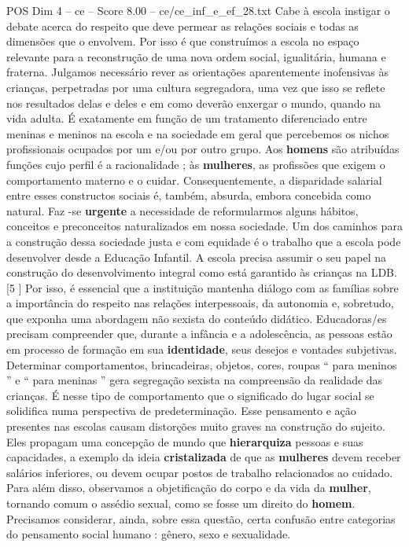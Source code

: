 \begin{textsample}{POS Dim 4 – ce – Score 8.00 – ce/ce\_inf\_e\_ef\_28.txt}
Cabe à escola instigar o debate acerca do respeito que deve permear as relações sociais e todas as dimensões que o envolvem.
Por isso é que construímos a escola no espaço relevante para a reconstrução de uma nova ordem social, igualitária, humana e fraterna.
Julgamos necessário rever as orientações aparentemente inofensivas às crianças, perpetradas por uma cultura segregadora, uma vez que isso se reflete nos resultados delas e deles e em como deverão enxergar o mundo, quando na vida adulta.
É exatamente em função de um tratamento diferenciado entre meninas e meninos na escola e na sociedade em geral que percebemos os nichos profissionais ocupados por um e/ou por outro grupo.
Aos \textbf{homens} são atribuídas funções cujo perfil é a racionalidade ; às \textbf{mulheres}, as profissões que exigem o comportamento materno e o cuidar.
Consequentemente, a disparidade salarial entre esses constructos sociais é, também, absurda, embora concebida como natural.
Faz -se \textbf{urgente} a necessidade de reformularmos alguns hábitos, conceitos e preconceitos naturalizados em nossa sociedade.
Um dos caminhos para a construção dessa sociedade justa e com equidade é o trabalho que a escola pode desenvolver desde a Educação Infantil.
A escola precisa assumir o seu papel na construção do desenvolvimento integral como está garantido às crianças na LDB.[5 ] Por isso, é essencial que a instituição mantenha diálogo com as famílias sobre a importância do respeito nas relações interpessoais, da autonomia e, sobretudo, que exponha uma abordagem não sexista do conteúdo didático.
Educadoras/es precisam compreender que, durante a infância e a adolescência, as pessoas estão em processo de formação em sua \textbf{identidade}, seus desejos e vontades subjetivas.
Determinar comportamentos, brincadeiras, objetos, cores, roupas “ para meninos ” e “ para meninas ” gera segregação sexista na compreensão da realidade das crianças.
É nesse tipo de comportamento que o significado do lugar social se solidifica numa perspectiva de predeterminação.
Esse pensamento e ação presentes nas escolas causam distorções muito graves na construção do sujeito.
Eles propagam uma concepção de mundo que \textbf{hierarquiza} pessoas e suas capacidades, a exemplo da ideia \textbf{cristalizada} de que as \textbf{mulheres} devem receber salários inferiores, ou devem ocupar postos de trabalho relacionados ao cuidado.
Para além disso, observamos a objetificação do corpo e da vida da \textbf{mulher}, tornando comum o assédio sexual, como se fosse um direito do \textbf{homem}.
Precisamos considerar, ainda, sobre essa questão, certa confusão entre categorias do pensamento social humano : gênero, sexo e sexualidade.

\end{textsample}
